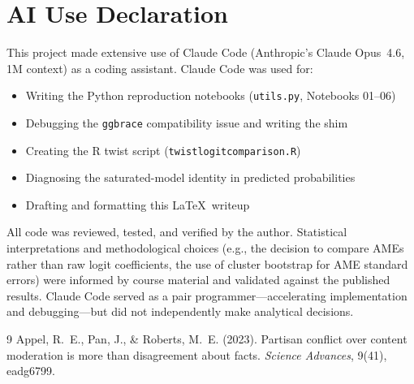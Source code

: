 \documentclass[12pt, a4paper]{article}
\renewcommand\_{\textunderscore\hspace{0pt}}
\begin{document}
\section*{AI Use Declaration}

This project made extensive use of Claude Code (Anthropic's Claude Opus~4.6, 1M context) as a coding assistant. Claude Code was used for:
\begin{itemize}[nosep]
  \item Writing the Python reproduction notebooks (\texttt{utils.py}, Notebooks 01--06)
  \item Debugging the \texttt{ggbrace} compatibility issue and writing the shim
  \item Creating the R twist script (\texttt{twist\_logit\_comparison.R})
  \item Diagnosing the saturated-model identity in predicted probabilities
  \item Drafting and formatting this \LaTeX\ writeup
\end{itemize}

All code was reviewed, tested, and verified by the author. Statistical interpretations and methodological choices (e.g., the decision to compare AMEs rather than raw logit coefficients, the use of cluster bootstrap for AME standard errors) were informed by course material and validated against the published results. Claude Code served as a pair programmer---accelerating implementation and debugging---but did not independently make analytical decisions.


\begin{thebibliography}{9}
Appel, R.~E., Pan, J., \& Roberts, M.~E. (2023).
Partisan conflict over content moderation is more than disagreement about facts.
\textit{Science Advances}, 9(41), eadg6799.
\end{thebibliography}
\end{document}
